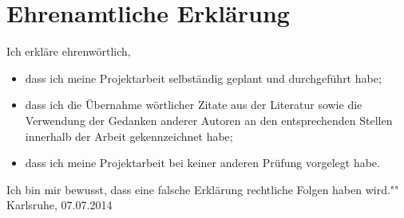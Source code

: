 \section{Ehrenamtliche Erklärung}

Ich erkläre ehrenwörtlich,
\begin{itemize}
    \item dass ich meine Projektarbeit selbständig geplant und durchgeführt habe;
    \item dass ich die Übernahme wörtlicher Zitate aus der Literatur sowie die Verwendung der Gedanken anderer Autoren an den entsprechenden Stellen innerhalb der Arbeit gekennzeichnet habe;
    \item dass ich meine Projektarbeit bei keiner anderen Prüfung
    vorgelegt habe.
\end{itemize}
Ich bin mir bewusst, dass eine falsche Erklärung rechtliche Folgen haben wird."" \\

\vspace{1cm}
Karlsruhe, 07.07.2014 